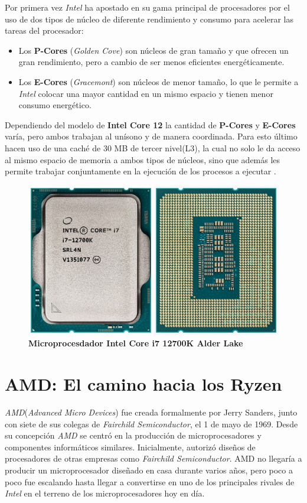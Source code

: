 Por primera vez \emph{Intel} ha apostado en su gama principal de procesadores por el uso de dos tipos de núcleo de diferente 
rendimiento y consumo para acelerar las tareas del procesador:

\begin{itemize}
	\item Los \textbf{P-Cores} (\emph{Golden Cove}) son núcleos de gran tamaño y que ofrecen un gran rendimiento, pero a cambio de ser menos eficientes energéticamente.
	\item Los \textbf{E-Cores} (\emph{Gracemont}) son núcleos de menor tamaño, lo que le permite a \emph{Intel} colocar una mayor cantidad en un mismo espacio y 
	tienen menor consumo energético.
\end{itemize}


Dependiendo del modelo de \textbf{Intel Core 12} la cantidad de \textbf{P-Cores} y \textbf{E-Cores} varía, pero ambos trabajan al unísono y de manera coordinada. 
Para esto último hacen uso de una caché de 30 MB de tercer nivel(L3), la cual no solo le da acceso al mismo espacio de memoria 
a ambos tipos de núcleos, sino que además les permite trabajar conjuntamente en la ejecución de los procesos a ejecutar .

\begin{figure}[htb]
	\centering
	\includegraphics[scale = 0.2]{Graphics/Intel_CPU_Core_i7_12700K_Alder_Lake.jpg}
	\caption{\textbf{Microprocesdador Intel Core i7 12700K Alder Lake}}
	\label{fig:26}
\end{figure}

\section{AMD: El camino hacia los Ryzen}
\emph{AMD}(\emph{Advanced Micro Devices}) fue creada formalmente por Jerry Sanders, junto con siete de sus colegas de \emph{Fairchild Semiconductor}, el 1 de mayo de 1969.
Desde su concepción  \emph{AMD} se centró en la producción de microprocesadores y componentes informáticos similares. Inicialmente,
autorizó diseños de procesadores de otras empresas como \emph{Fairchild Semiconductor}. AMD no llegaría a producir un microprocesador 
diseñado en casa durante varios años, pero poco a poco fue escalando hasta llegar a convertirse en uno de los principales 
rivales de \emph{Intel} en el terreno de los microprocesadores hoy en día.


